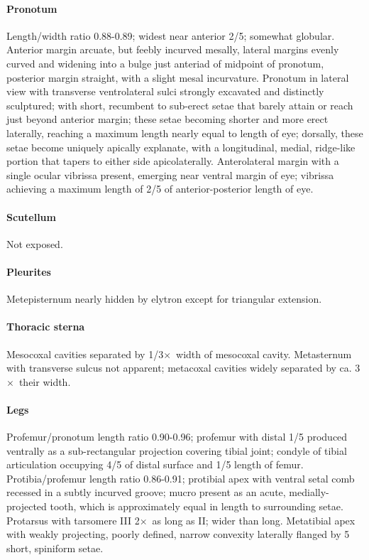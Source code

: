\documentclass[fleqn,10pt,lineno]{wlpeerj} %
\newcommand{\x}{$\times$~}
\begin{document}
			\paragraph{Pronotum}
				Length/width ratio 0.88-0.89; widest near anterior 2/5; somewhat globular. 
				Anterior margin arcuate, but feebly incurved mesally, lateral margins evenly curved and widening into a bulge just anteriad of midpoint of pronotum, posterior margin straight, with a slight mesal incurvature. 
				Pronotum in lateral view with transverse ventrolateral sulci strongly excavated and distinctly sculptured; with short, recumbent to sub-erect setae that barely attain or reach just beyond anterior margin; these setae becoming shorter and more erect laterally, reaching a maximum length nearly equal to length of eye; dorsally, these setae become uniquely apically explanate, with a longitudinal, medial, ridge-like portion that tapers to either side apicolaterally.
				Anterolateral margin with a single ocular vibrissa present, emerging near ventral margin of eye; vibrissa achieving a maximum length of 2/5 of anterior-posterior length of eye.
			\paragraph{Scutellum}
				Not exposed.
			\paragraph{Pleurites}
				Metepisternum nearly hidden by elytron except for triangular extension.
			\paragraph{Thoracic sterna} 
				Mesocoxal cavities separated by 1/3\x width of mesocoxal cavity. 
				Metasternum with transverse sulcus not apparent; metacoxal cavities widely separated by ca. 3\x their width.
			\paragraph{Legs}
				Profemur/pronotum length ratio 0.90-0.96; profemur with distal 1/5 produced ventrally as a sub-rectangular projection covering tibial joint; condyle of tibial articulation occupying 4/5 of distal surface and 1/5 length of femur. 
				Protibia/profemur length ratio 0.86-0.91; protibial apex with ventral setal comb recessed in a subtly incurved groove; mucro present as an acute, medially-projected tooth, which is approximately equal in length to surrounding setae. 
				Protarsus with tarsomere III 2\x as long as II; wider than long. 
				Metatibial apex with weakly projecting, poorly defined, narrow convexity laterally flanged by 5 short, spiniform setae.
\end{document}
